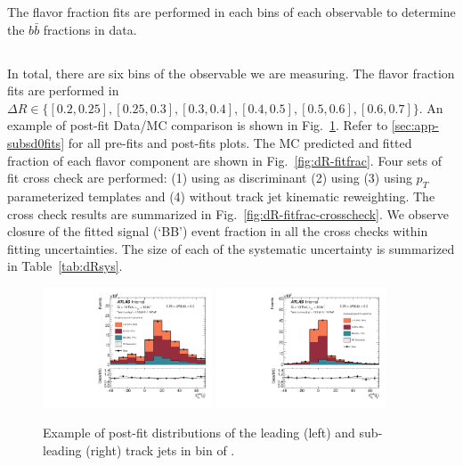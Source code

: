 \label{sec:gbb-bkgres}

The flavor fraction fits are performed in each bins of each observable to determine the $b\bar b $ fractions in data. 

\subsection{\drbb}

In total, there are six bins of the \drbb observable we are measuring. The flavor fraction fits are performed in $\Delta R \in\{[0.2, 0.25], [0.25, 0.3], [0.3, 0.4], [0.4,0.5], [0.5,0.6], [0.6,0.7]\}$. An example of post-fit Data/MC comparison is shown in Fig.~\ref{fig:dR-fit-example}. Refer to \ref{sec:app-subsd0fits} for all pre-fits and post-fits plots. The MC predicted and fitted fraction of each flavor component are shown in Fig.~\ref{fig:dR-fitfrac}. Four sets of fit cross check are performed: (1) using \sdzero as discriminant (2) using \subsubsdzero (3) using $p_T$ parameterized templates and (4) without track jet kinematic reweighting. The cross check results are summarized in Fig.~\ref{fig:dR-fitfrac-crosscheck}. We observe closure of the fitted signal (`BB') event fraction in all the cross checks within fitting uncertainties. The size of each of the systematic uncertainty is summarized in Table~\ref{tab:dRsys}.

\begin{figure}[htbp]
  \centering
 \includegraphics[width=0.45\textwidth]{figures/gbb/paperplots/Canv_Fit_dR_LpT_INF_SpT_INF_coarse_x}
 \includegraphics[width=0.45\textwidth]{figures/gbb/paperplots/Canv_Fit_b0_25_DeltaR_0_3_LpT_INF_SpT_INF_coarse_y}
\caption{Example of post-fit \subsdzero distributions of the leading (left) and sub-leading (right) track jets in bin of \drbb. }
  \label{fig:dR-fit-example}
\end{figure}

